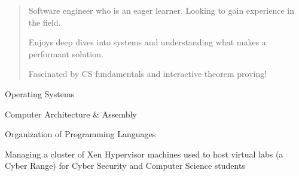   \begin{quote}
    Software engineer who is an eager learner. Looking to gain experience in the field. \par
    Enjoys deep dives into systems and understanding what makes a performant solution. \par
    Fascinated by CS fundamentals and interactive theorem proving!
  \end{quote}


  \smallskip{}

  \smallskip{}
  \cvtag{\LaTeX}
  
  Operating Systems \par
  Computer Architecture \& Assembly \par
  Organization of Programming Languages
  

  Managing a cluster of Xen Hypervisor machines used to host virtual labs (a Cyber Range) for Cyber Security and Computer Science students

